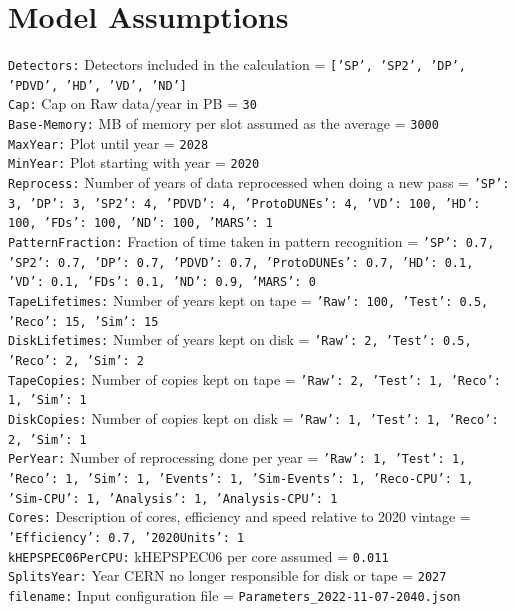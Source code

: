 \documentclass[12pt,landscape]{article}
\begin{document}
\section{Model Assumptions}
{\tt Detectors:} Detectors included in the calculation = {\tt ['SP', 'SP2', 'DP', 'PDVD', 'HD', 'VD', 'ND']} \\
{\tt Cap:} Cap on Raw data/year in PB = {\tt 30} \\
{\tt Base-Memory:} MB of memory per slot assumed as the average = {\tt 3000} \\
{\tt MaxYear:} Plot until year = {\tt 2028} \\
{\tt MinYear:} Plot starting with year = {\tt 2020} \\
{\tt Reprocess:} Number of years of data reprocessed when doing a new pass = {\tt {'SP': 3, 'DP': 3, 'SP2': 4, 'PDVD': 4, 'ProtoDUNEs': 4, 'VD': 100, 'HD': 100, 'FDs': 100, 'ND': 100, 'MARS': 1}} \\
{\tt PatternFraction:} Fraction of time taken in pattern recognition = {\tt {'SP': 0.7, 'SP2': 0.7, 'DP': 0.7, 'PDVD': 0.7, 'ProtoDUNEs': 0.7, 'HD': 0.1, 'VD': 0.1, 'FDs': 0.1, 'ND': 0.9, 'MARS': 0}} \\
{\tt TapeLifetimes:} Number of years kept on tape = {\tt {'Raw': 100, 'Test': 0.5, 'Reco': 15, 'Sim': 15}} \\
{\tt DiskLifetimes:} Number of years kept on disk = {\tt {'Raw': 2, 'Test': 0.5, 'Reco': 2, 'Sim': 2}} \\
{\tt TapeCopies:} Number of copies kept on tape = {\tt {'Raw': 2, 'Test': 1, 'Reco': 1, 'Sim': 1}} \\
{\tt DiskCopies:} Number of copies kept on disk = {\tt {'Raw': 1, 'Test': 1, 'Reco': 2, 'Sim': 1}} \\
{\tt PerYear:} Number of reprocessing done per year = {\tt {'Raw': 1, 'Test': 1, 'Reco': 1, 'Sim': 1, 'Events': 1, 'Sim-Events': 1, 'Reco-CPU': 1, 'Sim-CPU': 1, 'Analysis': 1, 'Analysis-CPU': 1}} \\
{\tt Cores:} Description of cores, efficiency and speed relative to 2020 vintage = {\tt {'Efficiency': 0.7, '2020Units': 1}} \\
{\tt kHEPSPEC06PerCPU:} kHEPSPEC06 per core assumed = {\tt 0.011} \\
{\tt SplitsYear:} Year CERN no longer responsible for disk or tape = {\tt 2027} \\
{\tt filename:} Input configuration file = {\tt Parameters\_2022-11-07-2040.json} \\
\end{document}

